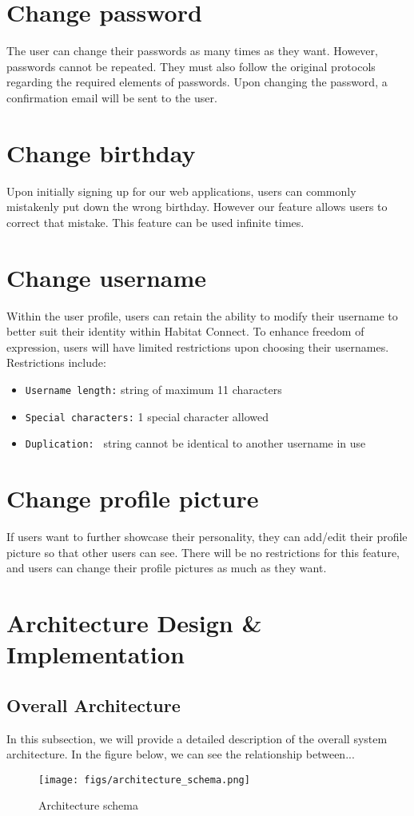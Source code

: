 \documentclass[conference]{IEEEtran}
\begin{document}
\section*{Change password}
The user can change their passwords as many times as they want. However, passwords cannot be repeated. They must also follow the original protocols regarding the required elements of passwords. Upon changing the password, a confirmation email will be sent to the user.
\section*{Change birthday}
Upon initially signing up for our web applications, users can commonly mistakenly put down the wrong birthday. However our feature allows users to correct that mistake. This feature can be used infinite times.
\section*{Change username}
Within the user profile, users can retain the ability to modify their username to better suit their  identity within Habitat Connect. To enhance freedom of expression, users will have limited restrictions upon choosing their usernames. Restrictions include:
\begin{itemize}
    \item \texttt{Username length:} string of maximum 11 characters
    \item \texttt{Special characters:} 1 special character allowed
    \item \texttt{Duplication: } string cannot be identical to another username in use
\end{itemize}
\section*{Change profile picture}
If users want to further showcase their personality, they can add/edit their profile picture so that other users can see. There will be no restrictions for this feature, and users can change their profile pictures as much as they want.



\section{Architecture Design \& Implementation}
\subsection{Overall Architecture}
In this subsection, we will provide a detailed description of the 
overall system architecture. In the figure below, we can see the relationship between...
\begin{figure}[H]
\centering
\texttt{[image: figs/architecture\_schema.png]}
\caption{Architecture schema}
\label{fig:Architecture schema}
\end{figure}
\end{document}

